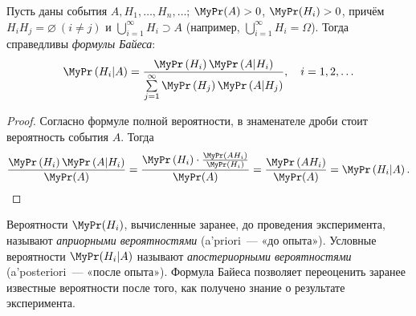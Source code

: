 \begin{namedthm}
	Пусть даны события $A, H_1, \ldots, H_n, \ldots$; ${\MyPr(A) > 0}$, ${\MyPr(H_i) > 0}$, причём $H_i H_j = \varnothing ~(i \neq j)$ и $\bigcup\limits_{i=1}^\infty H_i \supset A$ (например, $\bigcup\limits_{i=1}^{\infty}H_i = \Omega$). Тогда справедливы \textit{формулы Байеса}:
	\begin{equation*}
        \MyPr\left(H_{i} | A\right)= \frac{\MyPr\left(H_{i}\right) \MyPr\left(A | H_{i}\right)}{\sum\limits_{j=1}^{\infty} \MyPr\left(H_{j}\right) \MyPr\left(A | H_{j}\right)}, \quad i = 1, 2, \ldots
	\end{equation*}
\end{namedthm}
\begin{proof}
	Согласно формуле полной вероятности, в знаменателе дроби стоит вероятность события $A$.
	Тогда
	\begin{equation*}
        \frac{\MyPr\left(H_{i}\right) \MyPr\left(A | H_{i}\right)}{\MyPr(A)}=\frac{\MyPr\left(H_{i}\right) \cdot \frac{\MyPr\left(A H_{i}\right)}{\MyPr\left(H_{i}\right)}}{\MyPr(A)}=\frac{\MyPr\left(A H_{i}\right)}{\MyPr(A)}=\MyPr\left(H_{i} | A\right). \qedhere
	\end{equation*}
\end{proof}

Вероятности $\MyPr(H_i)$, вычисленные заранее, до проведения эксперимента, называют \textit{априорными вероятностями} (a’priori~--- «до опыта»). 
Условные вероятности $\MyPr(H_i | A)$ называют \textit{апостериорными вероятностями} (a’posteriori~--- «после опыта»). 
Формула Байеса позволяет переоценить заранее известные вероятности после того, как получено знание о результате эксперимента.

